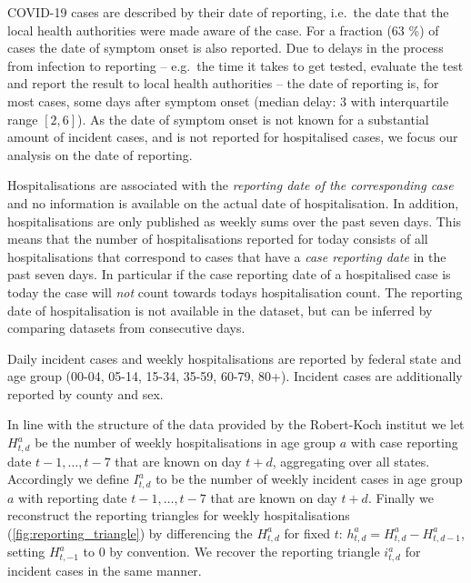 COVID-19 cases are described by their date of reporting, i.e.~the date
that the local health authorities were made aware of the case. For a
fraction (63 \%) of cases the date of symptom onset is also reported.
Due to delays in the process from infection to reporting -- e.g.~the
time it takes to get tested, evaluate the test and report the result to
local health authorities -- the date of reporting is, for most cases,
some days after symptom onset (median delay: 3 with interquartile range
\([2, 6]\)). As the date of symptom onset is not known for a substantial
amount of incident cases, and is not reported for hospitalised cases, we
focus our analysis on the date of reporting.

Hospitalisations are associated with the \emph{reporting date of the
corresponding case} and no information is available on the actual date
of hospitalisation. In addition, hospitalisations are only published as
weekly sums over the past seven days. This means that the number of
hospitalisations reported for today consists of all hospitalisations
that correspond to cases that have a \emph{case reporting date} in the
past seven days. In particular if the case reporting date of a
hospitalised case is today the case will \emph{not} count towards todays
hospitalisation count. The reporting date of hospitalisation is not
available in the dataset, but can be inferred by comparing datasets from
consecutive days.

Daily incident cases and weekly hospitalisations are reported by federal
state and age group (00-04, 05-14, 15-34, 35-59, 60-79, 80+). Incident
cases are additionally reported by county and sex.

In line with the structure of the data provided by the Robert-Koch
institut we let \(H^a_{t,d}\) be the number of weekly hospitalisations
in age group \(a\) with case reporting date \(t - 1, \dots, t - 7\) that
are known on day \(t + d\), aggregating over all states. Accordingly we
define \(I^a_{t,d}\) to be the number of weekly incident cases in age
group \(a\) with reporting date \(t - 1, \dots, t - 7\) that are known
on day \(t + d\). Finally we reconstruct the reporting triangles for
weekly hospitalisations (\cref{fig:reporting_triangle}) by
differencing the \(H^a_{t,d}\) for fixed \(t\):
\(h^a_{t,d} = H^a_{t,d} - H^a_{t, d - 1}\), setting \(H^a_{t, -1}\) to
\(0\) by convention. We recover the reporting triangle \(i^a_{t,d}\) for
incident cases in the same manner.

